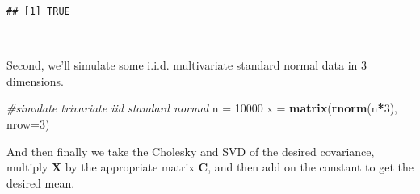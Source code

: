 \documentclass[
]{article}
\newenvironment{Shaded}{\begin{snugshade}}{\end{snugshade}}
\newcommand{\CommentTok}[1]{\textcolor[rgb]{0.56,0.35,0.01}{\textit{#1}}}
\newcommand{\DataTypeTok}[1]{\textcolor[rgb]{0.13,0.29,0.53}{#1}}
\newcommand{\DecValTok}[1]{\textcolor[rgb]{0.00,0.00,0.81}{#1}}
\newcommand{\KeywordTok}[1]{\textcolor[rgb]{0.13,0.29,0.53}{\textbf{#1}}}
\newcommand{\NormalTok}[1]{#1}
\newcommand{\OperatorTok}[1]{\textcolor[rgb]{0.81,0.36,0.00}{\textbf{#1}}}
\newcommand{\StringTok}[1]{\textcolor[rgb]{0.31,0.60,0.02}{#1}}
\begin{document}
\begin{Shaded}
\end{Shaded}

\begin{verbatim}
## [1] TRUE
\end{verbatim}

~

Second, we'll simulate some i.i.d. multivariate standard normal data in
3 dimensions.

\begin{Shaded}
\begin{Highlighting}[]
\CommentTok{\#simulate trivariate iid standard normal }
\NormalTok{n =}\StringTok{ }\DecValTok{10000}
\NormalTok{x =}\StringTok{ }\KeywordTok{matrix}\NormalTok{(}\KeywordTok{rnorm}\NormalTok{(n}\OperatorTok{*}\DecValTok{3}\NormalTok{), }\DataTypeTok{nrow=}\DecValTok{3}\NormalTok{)}
\end{Highlighting}
\end{Shaded}

\hfill\break

And then finally we take the Cholesky and SVD of the desired covariance,
multiply \(\boldsymbol{X}\) by the appropriate matrix
\(\boldsymbol{C}\), and then add on the constant to get the desired
mean.
\end{document}
